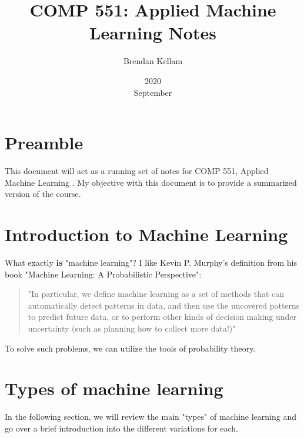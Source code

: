 \documentclass[12pt]{article}
\title{COMP 551: Applied Machine Learning Notes}
\date{2020\\ September}
\author{Brendan Kellam}
\begin{document}
\maketitle
\section{Preamble}
This document will act as a running set of notes for COMP 551, Applied Machine Learning \cite{551website}. My objective with this document is to provide a summarized version of the course.

\section{Introduction to Machine Learning}
What exactly \textbf{is} "machine learning"? I like Kevin P. Murphy's definition from his book "Machine Learning: A Probabilistic Perspective": 

\begin{quote}
"In particular, we define machine learning as a set of methods that can automatically detect patterns in data, and then use the uncovered patterns to predict future data, or to perform other kinds of decision making under uncertainty (such as planning how to collect more data!)" \cite{murphy}
\end{quote}

To solve such problems, we can utilize the tools of probability theory. 

\section{Types of machine learning}
In the following section, we will review the main "types" of machine learning and go over a brief introduction into the different variations for each.
\end{document}
